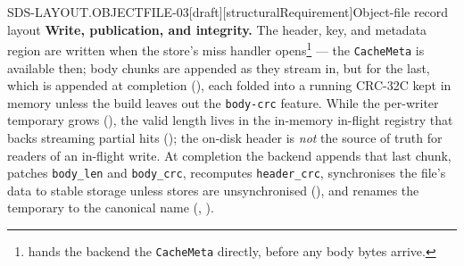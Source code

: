 \begin{requirement}{SDS-LAYOUT.OBJECTFILE-03}[draft][structuralRequirement]{Object-file record layout}
  \textbf{Write, publication, and integrity.} The header, key, and metadata
  region are written when the store's miss handler
  opens\footnote{
  hands the backend the \texttt{CacheMeta} directly, before any body bytes
  arrive.} --- the
  \texttt{CacheMeta} is available then; body
  chunks are appended as they stream in, but for the last, which is
  appended at completion (), each folded
  into a running CRC-32C kept in memory unless the build leaves out the
  \texttt{body-crc} feature. While the per-writer temporary grows
  (), the valid length lives in the in-memory
  in-flight registry that backs streaming partial hits
  (); the on-disk header is \emph{not}
  the source of truth for readers of an in-flight write. At completion the
  backend appends that last chunk, patches \texttt{body\_len} and
  \texttt{body\_crc}, recomputes
  \texttt{header\_crc}, synchronises the file's data to stable storage unless
  stores are unsynchronised (), and
  renames the temporary to the canonical name
  (, ).


\end{requirement}
